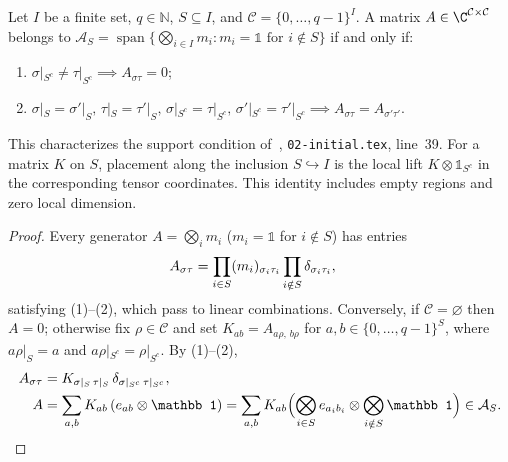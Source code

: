 \begin{lemma}
    \label{thm:area_law_supported_identity}
    \leanok
    Let $I$ be a finite set, $q\in\mathbb N$, $S\subseteq I$, and $\mathcal C=\{0,\ldots,q-1\}^I$. A matrix $A\in\C^{\mathcal C\times\mathcal C}$ belongs to $\mathcal A_S=\operatorname{span}\{\bigotimes_{i\in I}m_i:m_i=\mathbb 1\text{ for }i\notin S\}$ if and only if:
    \begin{enumerate}
        \item $\sigma|_{S^c}\ne\tau|_{S^c}\implies A_{\sigma\tau}=0$;
        \item $\sigma|_S=\sigma'|_S,\,\tau|_S=\tau'|_S,\,\sigma|_{S^c}=\tau|_{S^c},\,\sigma'|_{S^c}=\tau'|_{S^c}\implies A_{\sigma\tau}=A_{\sigma'\tau'}$.
    \end{enumerate}
    This characterizes the support condition of~\cite[Lemma~3.1]{OpenAI2026AreaLaw}, \texttt{02-initial.tex}, line~39.
    For a matrix $K$ on $S$, placement along the inclusion $S\hookrightarrow I$
    is the local lift $K\otimes\mathbb 1_{S^c}$ in the corresponding tensor
    coordinates. This identity includes empty regions and zero local dimension.
\end{lemma}
\begin{proof}
    \leanok
    Every generator $A=\bigotimes_i m_i$ ($m_i=\mathbb 1$ for $i\notin S$) has entries
    \begin{align}
        A_{\sigma\tau}
         & =\prod_{i\in S}(m_i)_{\sigma_i\tau_i}
        \prod_{i\notin S}\delta_{\sigma_i\tau_i},\notag
    \end{align}
    satisfying (1)--(2), which pass to linear combinations. Conversely, if $\mathcal C=\varnothing$ then $A=0$; otherwise fix $\rho\in\mathcal C$ and set $K_{ab}=A_{a\rho,\,b\rho}$ for $a,b\in\{0,\dots,q-1\}^S$, where $a\rho|_S=a$ and $a\rho|_{S^c}=\rho|_{S^c}$. By (1)--(2),
    \begin{align}
        A_{\sigma\tau}
         & =K_{\sigma|_S\,\tau|_S}\,\delta_{\sigma|_{S^c}\,\tau|_{S^c}},\notag \\
        A
         & =\sum_{a,b}K_{ab}\,(e_{ab}\otimes\mathbb 1)
        =\sum_{a,b}K_{ab}\Bigl(\bigotimes_{i\in S}e_{a_ib_i}\otimes\bigotimes_{i\notin S}\mathbb 1\Bigr)\in\mathcal A_S.\notag
    \end{align}
\end{proof}

